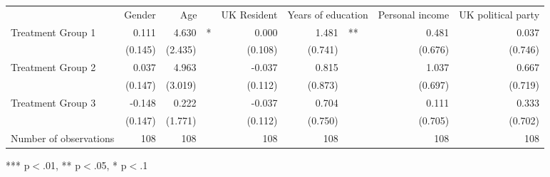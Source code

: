 \documentclass{article}
\begin{document}
\begin{table}[!h]
\centering
\begin{tabular}{lllllllll}
\cline{1-9}
\multicolumn{1}{r}{} &
  \multicolumn{1}{c}{Gender} &
  \multicolumn{2}{c}{Age} &
  \multicolumn{1}{c}{UK Resident} &
  \multicolumn{2}{c}{Years of education} &
  \multicolumn{1}{c}{Personal income} &
  \multicolumn{1}{c}{UK political party} \\
\cline{1-9}
\multicolumn{1}{l}{Treatment Group 1} &
  \multicolumn{1}{r}{0.111} &
  \multicolumn{1}{r}{4.630} &
  \multicolumn{1}{l}{*} &
  \multicolumn{1}{r}{0.000} &
  \multicolumn{1}{r}{1.481} &
  \multicolumn{1}{l}{**} &
  \multicolumn{1}{r}{0.481} &
  \multicolumn{1}{r}{0.037} \\
\multicolumn{1}{l}{} &
  \multicolumn{1}{r}{(0.145)} &
  \multicolumn{1}{r}{(2.435)} &
  \multicolumn{1}{l}{} &
  \multicolumn{1}{r}{(0.108)} &
  \multicolumn{1}{r}{(0.741)} &
  \multicolumn{1}{l}{} &
  \multicolumn{1}{r}{(0.676)} &
  \multicolumn{1}{r}{(0.746)} \\
\multicolumn{1}{l}{Treatment Group 2} &
  \multicolumn{1}{r}{0.037} &
  \multicolumn{1}{r}{4.963} &
  \multicolumn{1}{l}{} &
  \multicolumn{1}{r}{-0.037} &
  \multicolumn{1}{r}{0.815} &
  \multicolumn{1}{l}{} &
  \multicolumn{1}{r}{1.037} &
  \multicolumn{1}{r}{0.667} \\
\multicolumn{1}{l}{} &
  \multicolumn{1}{r}{(0.147)} &
  \multicolumn{1}{r}{(3.019)} &
  \multicolumn{1}{l}{} &
  \multicolumn{1}{r}{(0.112)} &
  \multicolumn{1}{r}{(0.873)} &
  \multicolumn{1}{l}{} &
  \multicolumn{1}{r}{(0.697)} &
  \multicolumn{1}{r}{(0.719)} \\
\multicolumn{1}{l}{Treatment Group 3} &
  \multicolumn{1}{r}{-0.148} &
  \multicolumn{1}{r}{0.222} &
  \multicolumn{1}{l}{} &
  \multicolumn{1}{r}{-0.037} &
  \multicolumn{1}{r}{0.704} &
  \multicolumn{1}{l}{} &
  \multicolumn{1}{r}{0.111} &
  \multicolumn{1}{r}{0.333} \\
\multicolumn{1}{l}{} &
  \multicolumn{1}{r}{(0.147)} &
  \multicolumn{1}{r}{(1.771)} &
  \multicolumn{1}{l}{} &
  \multicolumn{1}{r}{(0.112)} &
  \multicolumn{1}{r}{(0.750)} &
  \multicolumn{1}{l}{} &
  \multicolumn{1}{r}{(0.705)} &
  \multicolumn{1}{r}{(0.702)} \\
\multicolumn{1}{l}{Number of observations} &
  \multicolumn{1}{r}{108} &
  \multicolumn{1}{r}{108} &
  \multicolumn{1}{l}{} &
  \multicolumn{1}{r}{108} &
  \multicolumn{1}{r}{108} &
  \multicolumn{1}{l}{} &
  \multicolumn{1}{r}{108} &
  \multicolumn{1}{r}{108} \\
\cline{1-9}
\end{tabular}

\footnotesize{
*** p$<$.01, ** p$<$.05, * p$<$.1
}
\end{table}
\end{document}

